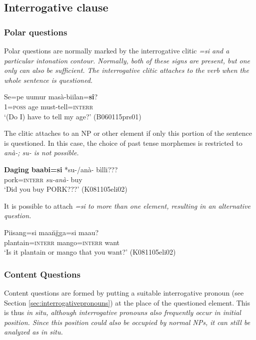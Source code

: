 \subsection{Interrogative clause}
\subsubsection{Polar questions}
Polar questions are normally marked by the interrogative clitic \em =si \em and a particular intonation contour. Normally, both of these signs are present, but one only can also be sufficient. The interrogative clitic attaches to the verb when the whole sentence is questioned.


\ea\label{ex:cl:interr:cl:v}
\gll Se=pe uumur masà-biilan=\textbf{si}? \\
 1=\textsc{poss} age must-tell=\textsc{interr}\\
`(Do I) have to tell my age?' (B060115prs01)
\z


The clitic attaches to an NP or other element if only this portion of the sentence is questioned. In this case, the choice of past tense morphemes is restricted to \em anà-\em; \em su- \em is not possible. 


\ea\label{ex:form:suana:question:polarconst}
\gll \textbf{Daging baabi=si} *su-/anà- bìlli??? \\
	pork=\textsc{interr} \textit{su-anà-} buy  \\
    `Did you buy PORK???'  (K081105eli02)
\z


It is possible to attach \em =si \em to more than one element, resulting in an alternative question.


\ea\label{ex:si:alternative}
\gll Piisang=si maa\u n\u gga=si maau? \\
     plantain=\textsc{interr} mango=\textsc{interr} want  \\
    `Is it plantain or mango that you want?'  (K081105eli02)
\z


\subsubsection{Content Questions}
Content questions are formed by putting a suitable interrogative pronoun (see Section \ref{sec:interrogativepronouns}) at the place of the questioned element. This is thus \em in situ\em, although interrogative pronouns also frequently occur in initial position. Since this position could also be occupied by normal NPs, it can still be analyzed as \em in situ\em.


